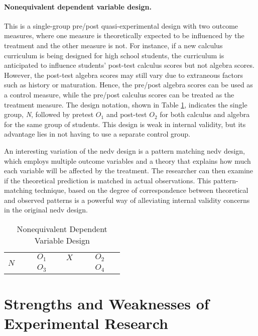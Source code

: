 \paragraph{Nonequivalent dependent variable design.} This is a single-group pre/post quasi-experimental design with two outcome measures, where one measure is theoretically expected to be influenced by the treatment and the other measure is not. For instance, if a new calculus curriculum is being designed for high school students, the curriculum is anticipated to influence students' post-test calculus scores but not algebra scores. However, the post-test algebra scores may still vary due to extraneous factors such as history or maturation. Hence, the pre/post algebra scores can be used as a control measure, while the pre/post calculus scores can be treated as the treatment measure. The design notation, shown in Table \ref{09:tab13}, indicates the single group, \textit{N}, followed by pretest $ O_1 $ and post-test $ O_2 $ for both calculus and algebra for the same group of students. This design is weak in internal validity, but its advantage lies in not having to use a separate control group.

An interesting variation of the \gls{nedv} design is a pattern matching \gls{nedv} design, which employs multiple outcome variables and a theory that explains how much each variable will be affected by the treatment. The researcher can then examine if the theoretical prediction is matched in actual observations. This pattern-matching technique, based on the degree of correspondence between theoretical and observed patterns is a powerful way of alleviating internal validity concerns in the original \gls{nedv} design.

\begin{table}[H]
	\centering
	\begin{tabularx}{0.65\linewidth}{p{0.15\linewidth}p{0.15\linewidth}p{0.15\linewidth}p{0.15\linewidth}}
		\toprule
		\multirow{2}{*}{$ N $} & $ O_1 $ & $ X $ & $ O_2 $ \\
		                       & $ O_3 $ &       & $ O_4 $ \\
		\bottomrule
	\end{tabularx}
	\caption{Nonequivalent Dependent Variable Design}
	\label{09:tab13}
\end{table}

\section{Strengths and Weaknesses of Experimental Research}

